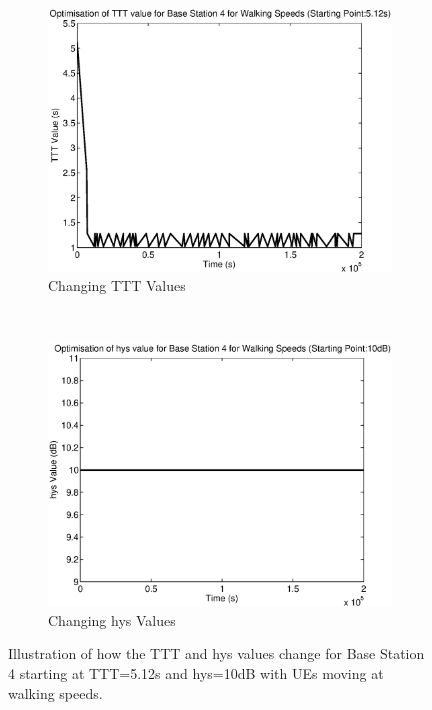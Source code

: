 \begin{figure}[H]
        \centering
        \begin{subfigure}[b]{0.49\textwidth}
                \includegraphics[width=\textwidth]{figures/graphs/walkhigh/TTT4.eps}
                \caption{Changing TTT Values}
        \end{subfigure}%
        ~ %
        \begin{subfigure}[b]{0.49\textwidth}
                \includegraphics[width=\textwidth]{figures/graphs/walkhigh/hys4.eps}
                \caption{Changing hys Values}
        \end{subfigure}
        \caption{Illustration of how the TTT and hys values change for Base Station 4 starting at TTT=5.12s and hys=10dB with UEs moving at walking speeds.}
\end{figure}
